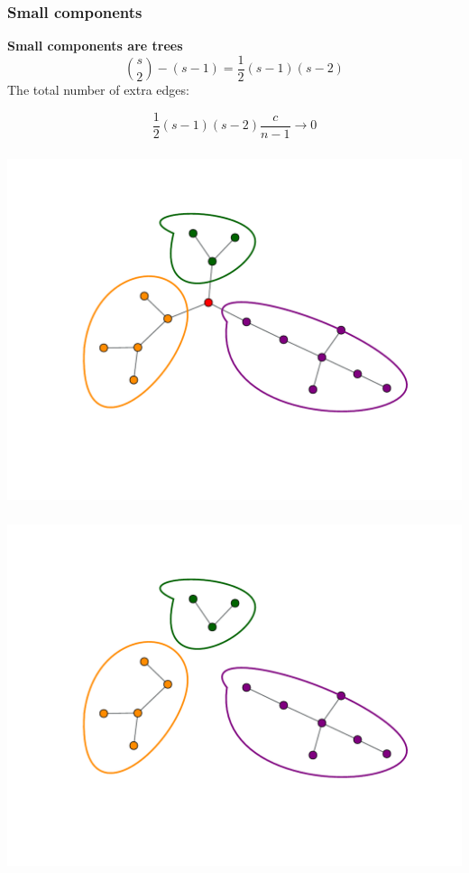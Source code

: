 \documentclass{beamer}
\begin{document}
\begin{frame}
    \frametitle{Small components}
    \centering
    {\bf Small components are trees}
    \vspace{2em}
    $$\binom{s}{2}-(s-1) = \frac{1}{2}(s-1)(s-2)$$
    The total number of extra edges:

    $$\frac{1}{2}(s-1)(s-2)\frac{c}{n-1} \rightarrow 0$$
\end{frame}
\begin{frame}
    \frametitle{}
    \centering
    \includegraphics[width=\columnwidth]{cavity.pdf}
\end{frame}
\begin{frame}
    \frametitle{}
    \centering
    \includegraphics[width=\columnwidth]{cavity2.pdf}
\end{frame}
\end{document}
